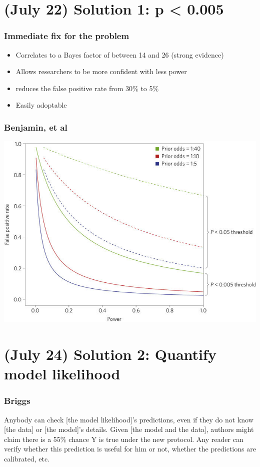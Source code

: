 \documentclass[10pt, compress]{beamer}
\begin{document}
\section{(July 22) Solution 1:  p < 0.005 }
\begin{frame}[fragile]
  \frametitle{Immediate fix for the problem}
  \begin{itemize}
  \item Correlates to a Bayes factor of between 14 and 26 (strong evidence)
  \item Allows researchers to be more confident with less power
    \item reduces the false positive rate from 30\% to 5\%
  \item Easily adoptable
  \end{itemize}
\end{frame}

\begin{frame}[fragile]
  \frametitle{Benjamin, et al}
  \includegraphics[width=.85\textwidth]{./frequentFigs/power_v_p}
\end{frame}

\section{(July 24) Solution 2: Quantify model likelihood }
\begin{frame}[fragile]
  \frametitle{Briggs}
  Anybody can check [the model likelihood]’s predictions, even if they do not know [the data] or [the model]’s details. Given [the model and the data], authors might claim there is a 55\% chance Y is true under the new protocol. Any reader can verify whether this prediction is useful for him or not, whether the predictions are calibrated, etc.
\end{frame}
\end{document}
